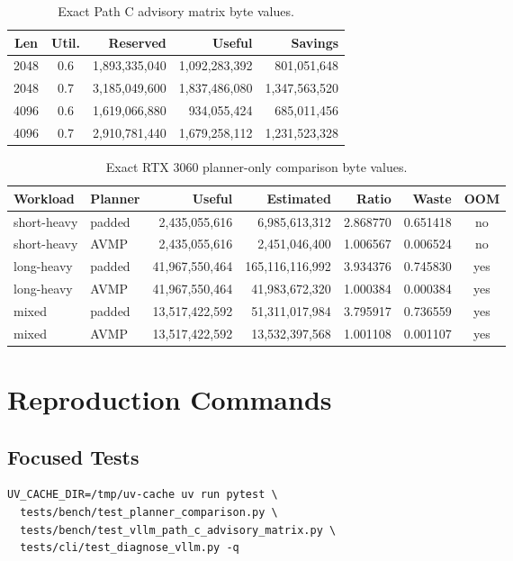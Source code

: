 \documentclass[10pt]{article}
\begin{document}
\begin{table}[h]
\centering
\small
\begin{tabular}{ccrrr}
\toprule
Len & Util. & Reserved & Useful & Savings \\
\midrule
2048 & 0.6 & 1,893,335,040 & 1,092,283,392 & 801,051,648 \\
2048 & 0.7 & 3,185,049,600 & 1,837,486,080 & 1,347,563,520 \\
4096 & 0.6 & 1,619,066,880 & 934,055,424 & 685,011,456 \\
4096 & 0.7 & 2,910,781,440 & 1,679,258,112 & 1,231,523,328 \\
\bottomrule
\end{tabular}
\caption{Exact Path C advisory matrix byte values.}
\end{table}

\begin{table}[h]
\centering
\small
\begin{tabular}{l l r r r r c}
\toprule
Workload & Planner & Useful & Estimated & Ratio & Waste & OOM \\
\midrule
short-heavy & padded & 2,435,055,616 & 6,985,613,312 & 2.868770 & 0.651418 & no \\
short-heavy & AVMP & 2,435,055,616 & 2,451,046,400 & 1.006567 & 0.006524 & no \\
long-heavy & padded & 41,967,550,464 & 165,116,116,992 & 3.934376 & 0.745830 & yes \\
long-heavy & AVMP & 41,967,550,464 & 41,983,672,320 & 1.000384 & 0.000384 & yes \\
mixed & padded & 13,517,422,592 & 51,311,017,984 & 3.795917 & 0.736559 & yes \\
mixed & AVMP & 13,517,422,592 & 13,532,397,568 & 1.001108 & 0.001107 & yes \\
\bottomrule
\end{tabular}
\caption{Exact RTX 3060 planner-only comparison byte values.}
\end{table}

\section{Reproduction Commands}

\subsection{Focused Tests}

\begin{verbatim}
UV_CACHE_DIR=/tmp/uv-cache uv run pytest \
  tests/bench/test_planner_comparison.py \
  tests/bench/test_vllm_path_c_advisory_matrix.py \
  tests/cli/test_diagnose_vllm.py -q
\end{verbatim}
\end{document}
